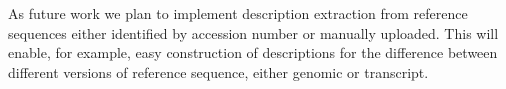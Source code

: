 \documentclass[final, slidestop]{beamer}
\begin{document}
\begin{frame}{}
\begin{myPoster}
{      As future work we plan to implement description extraction from reference
      sequences either identified by accession number or manually uploaded.
      This will enable, for example, easy construction of descriptions for the
      difference between different versions of reference sequence, either
      genomic or transcript.
    }
  \end{myPoster}
\end{frame}
\end{document}

